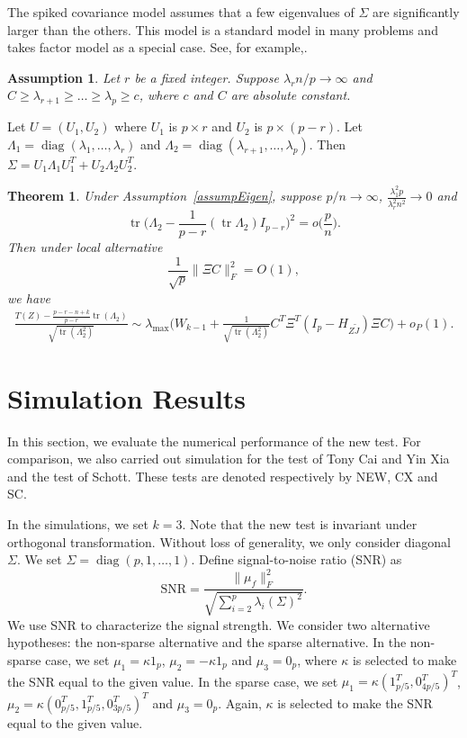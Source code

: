 \documentclass[review]{elsarticle}
\DeclareMathOperator{\mytr}{tr}
\DeclareMathOperator{\mydiag}{diag}
\theoremstyle{plain}
\newtheorem{theorem}{\quad\quad Theorem}
\newtheorem{assumption}{\quad\quad Assumption}
\theoremstyle{definition}
\theoremstyle{remark}
\begin{document}
The spiked covariance model assumes that a few eigenvalues of $\Sigma$ are significantly larger than the others. This model is a standard model in many problems and takes factor model as a special case.
See, for example,.

\begin{assumption}\label{assumpEigen}
    Let $r$ be a fixed integer.
    Suppose ${\lambda_r n}/{p}\to \infty$ and $C \geq \lambda_{r+1} \geq \ldots \geq \lambda_{p} \geq c$, where $c$ and $C$ are absolute constant.
\end{assumption}
Let $U=(U_1,U_2)$ where $U_1$ is $p\times r$ and $U_2$ is $p\times (p-r)$. Let $\Lambda_1=\mydiag(\lambda_1,\ldots,\lambda_r)$ and $\Lambda_2=\mydiag(\lambda_{r+1},\ldots,\lambda_p)$.
Then $\Sigma=U_1\Lambda_1 U_1^T+U_2\Lambda_2 U_2^T$.


\begin{theorem}\label{thm1}
    Under Assumption~\eqref{assumpEigen}, suppose $p/n\to \infty$,
    $\frac{\lambda_1^2 p}{\lambda_r^2 n^2}\to 0$ and
    $$
    \mytr\Big(\Lambda_2-\frac{1}{p-r}(\mytr \Lambda_2)I_{p-r}\Big)^2=o\big(\frac{p}{n}\big).
    $$
    Then under local alternative
    \begin{equation*}
        \frac{1}{\sqrt{p}}\|\Xi C\|_F^2=O(1),
    \end{equation*}
    we have
    $$
    \begin{aligned}
        \frac{T(Z)-\frac{p-r-n+k}{p-r}\mytr(\Lambda_2)}{\sqrt{\mytr (\Lambda_2^2)}}
        \sim
        \lambda_{\max}\Big(W_{k-1}+\tfrac{1}{\sqrt{\mytr(\Lambda_2^2)}} C^T \Xi^T (I_p-H_{Z\tilde{J}})\Xi C\Big)
        +o_P(1).
    \end{aligned}
    $$
\end{theorem}




\section{Simulation Results}

In this section, we evaluate the numerical performance of the new test. For comparison, we also carried out simulation for the test of Tony Cai and Yin Xia and the test of Schott. These tests are denoted respectively by NEW, CX and SC.

In the simulations, we set $k=3$.
Note that the new test is invariant under orthogonal transformation.
Without loss of generality, we only consider diagonal $\Sigma$.
We set $\Sigma=\mydiag(p,1,\ldots,1)$.
Define signal-to-noise ratio (SNR) as
$$
\textrm{SNR}=\frac{\|\mu_f\|_F^2}{\sqrt{\sum_{i=2}^{p}\lambda_i(\Sigma)^2}}.
$$
We use SNR to characterize the signal strength.
We consider two alternative hypotheses: the non-sparse alternative and the sparse alternative.
In the non-sparse case, we set $\mu_1=\kappa 1_p$, $\mu_2=-\kappa 1_p$ and $\mu_3=0_p$, where $\kappa$ is selected to make the SNR equal to the given value.
In the sparse case, we set $\mu_1=\kappa (1_{p/5}^T,0_{4p/5}^T)^T$, $\mu_2=\kappa (0_{p/5}^T, 1_{p/5}^T,0_{3p/5}^T)^T$ and $\mu_3=0_p$. Again, $\kappa$ is selected to make the SNR equal to the given value.
\end{document}
